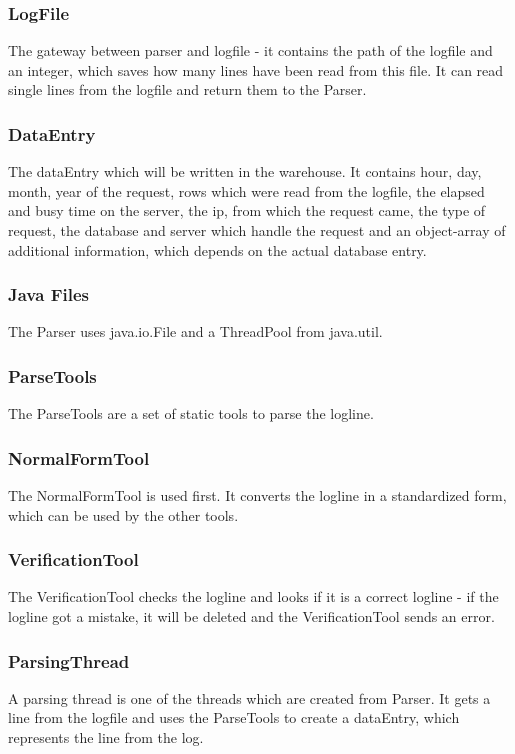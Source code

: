 \subsubsection*{LogFile}
The gateway between parser and logfile - it contains the path of the logfile and an integer, 
which saves how many lines have been read from this file. It can read single lines from the logfile and return them to 
the Parser.

\subsubsection*{DataEntry}
The dataEntry which will be written in the warehouse. It contains hour, day, month, year of the request, rows which were read 
from the logfile, the elapsed and busy time on the server, the ip, from which the request came, the type of request, the database
and server which handle the request and an object-array of additional information, which depends on the actual database entry.

\subsubsection*{Java Files}
The Parser uses java.io.File and a ThreadPool from java.util.

\subsubsection*{ParseTools}
The ParseTools are a set of static tools to parse the logline.

\subsubsection*{NormalFormTool}
The NormalFormTool is used first. It converts the logline in a standardized form, which can be used by the other tools.

\subsubsection*{VerificationTool}
The VerificationTool checks the logline and looks if it is a correct logline - if the logline got a mistake, it will 
be deleted and the VerificationTool sends an error.



\subsubsection*{ParsingThread}
A parsing thread is one of the threads which are created from Parser. It gets a line from the logfile and uses the ParseTools
to create a dataEntry, which represents the line from the log. 
